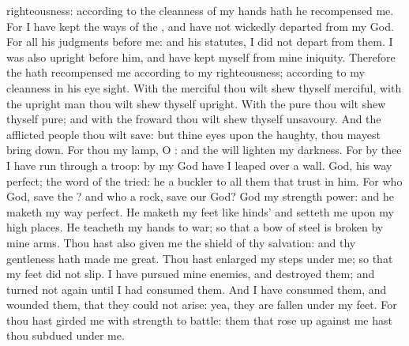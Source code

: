 {righteousness: according to the
cleanness of my
hands hath he
recompensed me.
For I have
kept the
ways of the
{}, and have not wickedly
departed from my
God.
For all his
judgments
{} before me: and
{} his
statutes, I did not
depart from them.
I was also
upright before him, and have
kept myself from mine
iniquity.
Therefore the
{} hath
recompensed me according to my
righteousness; according to my
cleanness in his eye
sight.
With the
merciful thou wilt shew thyself
merciful,
{} with the
upright
man thou wilt shew thyself
upright.
With the
pure thou wilt shew thyself
pure; and with the
froward thou wilt shew thyself
unsavoury.
And the
afflicted
people thou wilt
save: but thine
eyes
{} upon the
haughty,
{} thou mayest bring
{}
down.
For thou
{} my
lamp, O
{}: and the
{} will
lighten my
darkness.
For by thee I have
run through a
troop: by my
God have I leaped
over a
wall.
God, his
way
{}
perfect; the
word of the
{}
{}
tried: he
{} a
buckler to all them that
trust in him.
For who
{}
God,
save the
{}? and who
{} a
rock,
save our
God?
God
{} my
strength
{}
power: and he
maketh my
way
perfect.
He
maketh my
feet
like
hinds’
{} and
setteth me upon my high
places.
He
teacheth my
hands to
war; so that a
bow of
steel is
broken by mine
arms.
Thou hast also
given me the
shield of thy
salvation: and thy
gentleness hath made me
great.
Thou hast
enlarged my
steps under me; so that my
feet did not
slip.
I have
pursued mine
enemies, and
destroyed them; and turned not
again until I had
consumed them.
And I have
consumed them, and
wounded them, that they could not
arise: yea, they are
fallen under my
feet.
For thou hast
girded me with
strength to
battle: them that rose
up against me hast thou
subdued under me.
}
